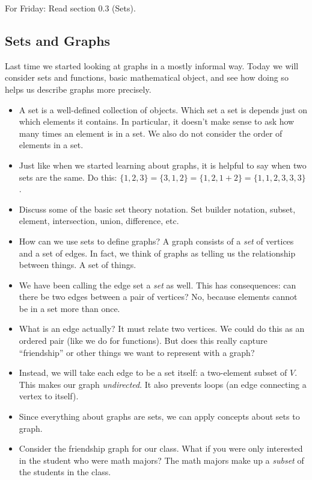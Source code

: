 \documentclass[12pt]{article}
\theoremstyle{plain}
\theoremstyle{definition}
\theoremstyle{remark}
\newcommand{\todayis}[1]{\clearpage{\rhead{\footnotesize #1}}}
\begin{document}
For Friday: Read section 0.3 (Sets).


\todayis{Friday, August 24}

\subsection*{Sets and Graphs}

Last time we started looking at graphs in a mostly informal way.  Today we will consider sets and functions, basic mathematical object, and see how doing so helps us describe graphs more precisely.

\begin{itemize}
  \item A set is a well-defined collection of objects.  Which set a set is depends just on which elements it contains.  In particular, it doesn't make sense to ask how many times an element is in a set.  We also do not consider the order of elements in a set.
  \item Just like when we started learning about graphs, it is helpful to say when two sets are the same.  Do this: $\{1,2,3\} = \{3,1,2\} = \{1, 2, 1+2\} = \{1,1, 2, 3, 3, 3\}$.
  \item Discuss some of the basic set theory notation.  Set builder notation, subset, element, intersection, union, difference, etc.
  \item How can we use sets to define graphs?  A graph consists of a \emph{set} of vertices and a set of edges.  In fact, we think of graphs as telling us the relationship between things.  A set of things.
  \item We have been calling the edge set a \emph{set} as well.  This has consequences: can there be two edges between a pair of vertices?  No, because elements cannot be in a set more than once.
  \item What is an edge actually?  It must relate two vertices.  We could do this as an ordered pair (like we do for functions).  But does this really capture ``friendship'' or other things we want to represent with a graph?
  \item Instead, we will take each edge to be a set itself: a two-element subset of $V$. This makes our graph \emph{undirected}.  It also prevents loops (an edge connecting a vertex to itself).
  \item Since everything about graphs are sets, we can apply concepts about sets to graph.
  \item Consider the friendship graph for our class.  What if you were only interested in the student who were math majors?  The math majors make up a \emph{subset} of the students in the class.

\end{itemize}
\end{document}
